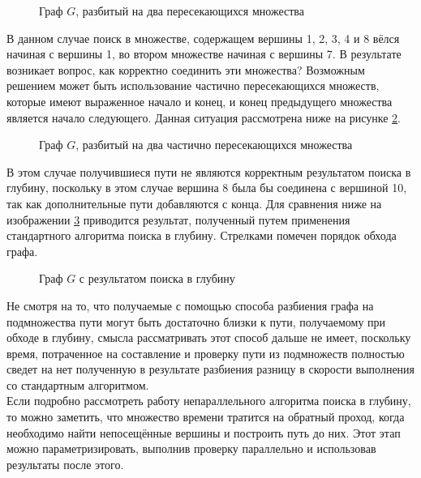 \begin{figure}[H]
	\center{\texttt{[image: g\_1]}}
	\caption{Граф $G$, разбитый на два пересекающихся множества}
	\label{fig:graph_1}
\end{figure}

В данном случае поиск в множестве, содержащем вершины 1, 2, 3, 4 и 8 вёлся начиная с вершины 1, во втором множестве начиная с вершины 7. В результате возникает вопрос, как корректно соединить эти множества? Возможным решением может быть использование частично пересекающихся множеств, которые имеют выраженное начало и конец, и конец предыдущего множества является начало следующего. Данная ситуация рассмотрена ниже  на рисунке \ref{fig:graph_2}.

\begin{figure}[H]
	\center{\texttt{[image: g\_2]}}
	\caption{Граф $G$, разбитый на два частично пересекающихся множества}
	\label{fig:graph_2}
\end{figure}

В этом случае получившиеся пути не являются корректным результатом поиска в глубину, поскольку в этом случае вершина 8 была бы соединена с вершиной 10, так как дополнительные пути добавляются с конца. Для сравнения ниже на изображении  \ref{fig:g_simple} приводится результат, полученный путем применения стандартного алгоритма поиска в глубину. Стрелками помечен порядок обхода графа.

\begin{figure}[H]
	\caption{Граф $G$ с результатом поиска в глубину}
	\label{fig:g_simple}
\end{figure}

Не смотря на то, что получаемые с помощью способа разбиения графа на подмножества пути могут быть достаточно близки к пути, получаемому при обходе в глубину, смысла рассматривать этот способ дальше не имеет, поскольку время, потраченное на составление и проверку пути из подмножеств полностью сведет на нет полученную в результате разбиения разницу в скорости выполнения со стандартным алгоритмом.\\

Если подробно рассмотреть работу непараллельного алгоритма поиска в глубину, то можно заметить, что множество времени тратится на обратный проход, когда необходимо найти непосещённые вершины и построить путь до них. Этот этап можно параметризировать, выполнив проверку параллельно и использовав результаты после этого.\\

